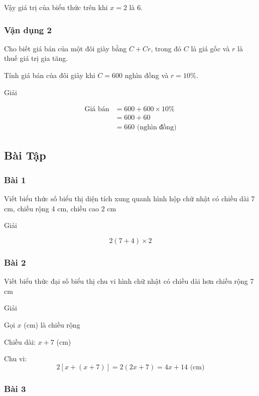 \documentclass[
]{article}
\begin{document}
Vậy giá trị của biểu thức trên khi \(x = 2\) là 6.

\subsubsection{Vận dụng 2}\label{vux1eadn-dux1ee5ng-2}

Cho biết giá bán của một đôi giày bằng \(C + Cr\), trong đó \(C\) là giá
gốc và \(r\) là thuế giá trị gia tăng.

Tính giá bán của đôi giày khi \(C = 600\) nghìn đồng và \(r = 10\%\).

Giải

\begin{align*}
\text{Giá bán} &= 600 + 600 \times 10\% \\
&= 600 + 60 \\
&= 660 \text{ (nghìn đồng)}
\end{align*}

\subsection{Bài Tập}\label{buxe0i-tux1eadp}

\subsubsection{Bài 1}\label{buxe0i-1}

Viết biểu thức số biểu thị diện tích xung quanh hình hộp chữ nhật có
chiều dài 7 cm, chiều rộng 4 cm, chiều cao 2 cm

Giải

\[2(7 + 4) \times 2\]

\subsubsection{Bài 2}\label{buxe0i-2}

Viết biểu thức đại số biểu thị chu vi hình chữ nhật có chiều dài hơn
chiều rộng 7 cm

Giải

Gọi \(x\) (cm) là chiều rộng

Chiều dài: \(x + 7\) (cm)

Chu vi: \[2[x + (x + 7)] = 2(2x + 7) = 4x + 14 \text{ (cm)}\]

\subsubsection{Bài 3}\label{buxe0i-3}
\end{document}
